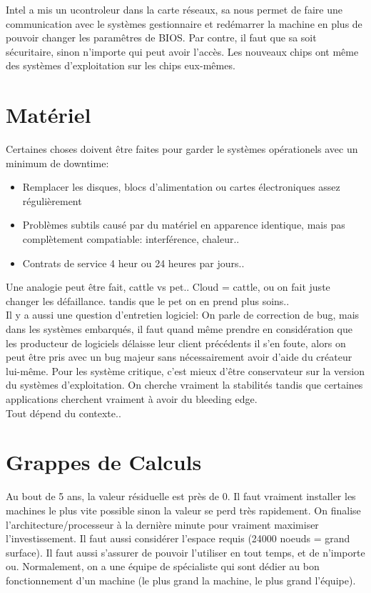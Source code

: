 \documentclass[oneside]{book}
\begin{document}
Intel a mis un ucontroleur dans la carte réseaux, sa nous permet de faire une communication avec le systèmes gestionnaire et redémarrer la machine en plus de pouvoir changer les paramêtres de BIOS. Par contre, il faut que sa soit sécuritaire, sinon n'importe qui peut avoir l'accès. Les nouveaux chips ont même des systèmes d'exploitation sur les chips eux-mêmes.

\section{Matériel}
Certaines choses doivent être faites pour garder le systèmes opérationels avec un minimum de downtime:
\begin{itemize}
\item Remplacer les disques, blocs d'alimentation ou cartes électroniques assez régulièrement
\item Problèmes subtils causé par du matériel en apparence identique, mais pas complètement compatiable: interférence, chaleur..
\item Contrats de service 4 heur ou 24 heures par jours..
\end{itemize}

Une analogie peut être fait, cattle vs pet.. Cloud = cattle, ou on fait juste changer les défaillance. tandis que le pet on en prend plus soins..\\

Il y a aussi une question d'entretien logiciel: On parle de correction de bug, mais dans les systèmes embarqués, il faut quand même prendre en considération que les producteur de logiciels délaisse leur client précédents il s'en foute, alors on peut être pris avec un bug majeur sans nécessairement avoir d'aide du créateur lui-même. Pour les système critique, c'est mieux d'être conservateur sur la version du systèmes d'exploitation. On cherche vraiment la stabilités tandis que certaines applications cherchent vraiment à avoir du bleeding edge.\\

Tout dépend du contexte..\\

\section{Grappes de Calculs}
Au bout de 5 ans, la valeur résiduelle est près de 0. Il faut vraiment installer les machines le plus vite possible sinon la valeur se perd très rapidement. On finalise l'architecture/processeur à la dernière minute pour vraiment maximiser l'investissement. Il faut aussi considérer l'espace requis (24000 noeuds = grand surface). Il faut aussi s'assurer de pouvoir l'utiliser en tout temps, et de n'importe ou. Normalement, on a une équipe de spécialiste qui sont dédier au bon fonctionnement d'un machine (le plus grand la machine, le plus grand l'équipe).\\
\end{document}
